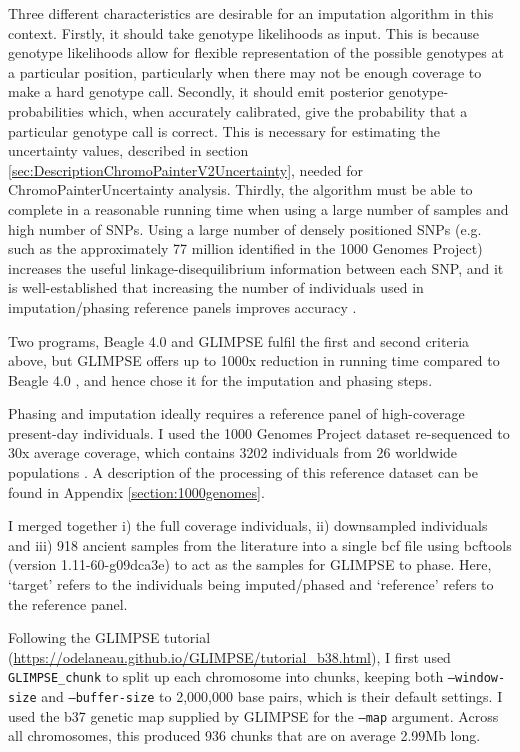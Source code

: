 {Three different characteristics are desirable for an imputation algorithm in this context. Firstly, it should take genotype likelihoods as input. This is because genotype likelihoods allow for flexible representation of the possible genotypes at a particular position, particularly when there may not be enough coverage to make a hard genotype call. Secondly, it should emit posterior genotype-probabilities which, when accurately calibrated, give the probability that a particular genotype call is correct. This is necessary for estimating the uncertainty values, described in section \ref{sec:DescriptionChromoPainterV2Uncertainty}, needed for ChromoPainterUncertainty analysis. Thirdly, the algorithm must be able to complete in a reasonable running time when using a large number of samples and high number of SNPs. Using a large number of densely positioned SNPs (e.g. such as the approximately 77 million identified in the 1000 Genomes Project) increases the useful linkage-disequilibrium information between each SNP, and it is well-established that increasing the number of individuals used in imputation/phasing reference panels improves accuracy \cite{delaneau2018integrative, HUANG2009235, mccarthy2016reference, rubinacci2021efficient}. 

Two programs, Beagle 4.0 \cite{Browning2007} and GLIMPSE \cite{rubinacci2021efficient} fulfil the first and second criteria above, but GLIMPSE offers up to 1000x reduction in running time compared to Beagle 4.0 \cite{rubinacci2021efficicanent}, and hence chose it for the imputation and phasing steps.   

Phasing and imputation ideally requires a reference panel of high-coverage present-day individuals. I used the 1000 Genomes Project dataset re-sequenced to 30x average coverage, which contains 3202 individuals from 26 worldwide populations \cite{byrska2021high}. A description of the processing of this reference dataset can be found in Appendix \ref{section:1000genomes}.

I merged together i) the full coverage individuals, ii) downsampled individuals and iii) 918 ancient samples from the literature into a single bcf file using bcftools (version 1.11-60-g09dca3e) \cite{li2011statistical} to act as the samples for GLIMPSE to phase. Here, `target' refers to the individuals being imputed/phased and `reference' refers to the reference panel.  

Following the GLIMPSE tutorial (\url{https://odelaneau.github.io/GLIMPSE/tutorial_b38.html}), I first used \texttt{GLIMPSE\_chunk} to split up each  chromosome into chunks, keeping both \texttt{--window-size} and \texttt{--buffer-size} to 2,000,000 base pairs, which is their default settings. I used the b37 genetic map supplied by GLIMPSE for the \texttt{--map} argument. Across all chromosomes, this produced 936 chunks that are on average 2.99Mb long. 

}
